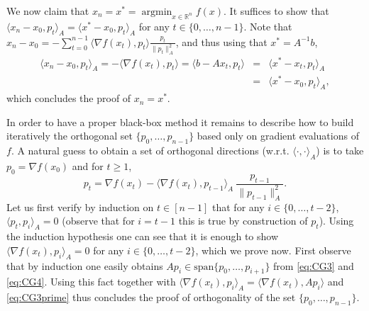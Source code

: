\documentclass[openany]{now}
\newcommand{\R}{\mathbb{R}}
\newcommand{\argmin}{\mathop{\mathrm{argmin}}}
\begin{document}
We now claim that $x_n = x^* = \argmin_{x \in \R^n} f(x)$. It suffices to show that $\langle x_n -x_0 , p_t \rangle_A = \langle x^*-x_0 , p_t \rangle_A$ for any $t\in \{0,\hdots,n-1\}$. Note that $x_n - x_0 = - \sum_{t=0}^{n-1} \langle \nabla f(x_t), p_t \rangle \frac{p_t}{\|p_t\|_A^2}$, and thus using that $x^* = A^{-1} b$,
\begin{eqnarray*}
\langle x_n -x_0 , p_t \rangle_A = - \langle \nabla f(x_t) , p_t \rangle = \langle b - A x_t , p_t \rangle & = & \langle x^* - x_t, p_t \rangle_A \\
& = &  \langle x^* - x_0, p_t \rangle_A ,
\end{eqnarray*}
which concludes the proof of $x_n = x^*$.
\newline

In order to have a proper black-box method it remains to describe how to build iteratively the orthogonal set $\{p_0, \hdots, p_{n-1}\}$ based only on gradient evaluations of $f$. A natural guess to obtain a set of orthogonal directions (w.r.t. $\langle \cdot , \cdot \rangle_A$) is to take $p_0 = \nabla f(x_0)$ and for $t \geq 1$,
\begin{equation} \label{eq:CG4}
p_t = \nabla f(x_t) - \langle \nabla f(x_t), p_{t-1} \rangle_A \ \frac{p_{t-1}}{\|p_{t-1}\|^2_A} .
\end{equation}
Let us first verify by induction on $t \in [n-1]$ that for any $i \in \{0,\hdots,t-2\}$, $\langle p_t, p_{i}\rangle_A = 0$ (observe that for $i=t-1$ this is true by construction of $p_t$). Using the induction hypothesis one can see that it is enough to show $\langle \nabla f(x_t), p_i \rangle_A = 0$ for any $i \in \{0, \hdots, t-2\}$, which we prove now. First observe that by induction one easily obtains $A p_i \in \mathrm{span}\{p_0, \hdots, p_{i+1}\}$ from \eqref{eq:CG3} and \eqref{eq:CG4}. Using this fact together with $\langle \nabla f(x_t), p_i \rangle_A = \langle \nabla f(x_t), A p_i \rangle$ and \eqref{eq:CG3prime} thus concludes the proof of orthogonality of the set $\{p_0, \hdots, p_{n-1}\}$.
\end{document}
